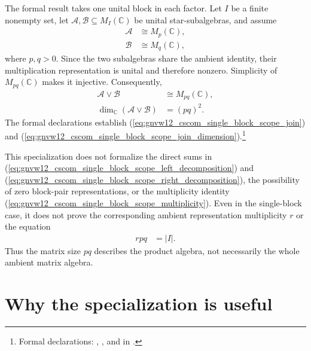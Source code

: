 \documentclass{article}
\begin{document}
The formal result takes one unital block in each factor. Let $I$ be a finite
nonempty set, let
$\mathcal A,\mathcal B\subseteq M_I(\mathbb C)$ be unital star-subalgebras,
and assume
\begin{align}
    \mathcal A
     & \cong M_p(\mathbb C),
    \label{eq:gnvw12_cscom_single_block_scope_left_matrix} \\
    \mathcal B
     & \cong M_q(\mathbb C),
    \label{eq:gnvw12_cscom_single_block_scope_right_matrix}
\end{align}
where $p,q>0$. Since the two subalgebras share the ambient identity, their
multiplication representation is unital and therefore nonzero. Simplicity of
$M_{pq}(\mathbb C)$ makes it injective. Consequently,
\begin{align}
    \mathcal A\vee\mathcal B
     & \cong M_{pq}(\mathbb C),
    \label{eq:gnvw12_cscom_single_block_scope_join} \\
    \dim_{\mathbb C}(\mathcal A\vee\mathcal B)
     & =(pq)^2.
    \label{eq:gnvw12_cscom_single_block_scope_join_dimension}
\end{align}
The formal declarations establish
(\ref{eq:gnvw12_cscom_single_block_scope_join}) and
(\ref{eq:gnvw12_cscom_single_block_scope_join_dimension}).\footnote{Formal
    declarations:
    ,
    , and
     in
    .}

This specialization does not formalize the direct sums in
(\ref{eq:gnvw12_cscom_single_block_scope_left_decomposition}) and
(\ref{eq:gnvw12_cscom_single_block_scope_right_decomposition}), the possibility
of zero block-pair representations, or the multiplicity identity
(\ref{eq:gnvw12_cscom_single_block_scope_multiplicity}). Even in the
single-block case, it does not prove the corresponding ambient representation
multiplicity $r$ or the equation
\begin{align}
    r p q
     & =|I|.
    \label{eq:gnvw12_cscom_single_block_scope_single_multiplicity}
\end{align}
Thus the matrix size $pq$ describes the product algebra, not necessarily the
whole ambient matrix algebra.

\section{Why the specialization is useful}
\end{document}
